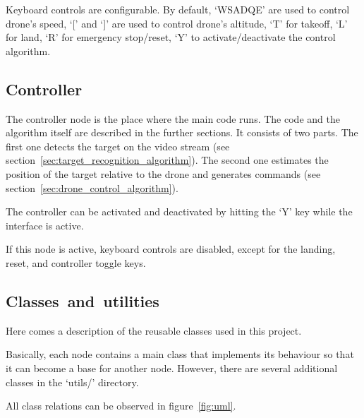 \documentclass[12pt]{article}
\begin{document}
    Keyboard controls are configurable. By default, `WSADQE' are used to
    control drone's speed, `[' and `]' are used to
    control drone's altitude, `T' for takeoff, `L' for land, `R' for emergency
    stop/reset, `Y' to activate/deactivate the control algorithm.

    \subsection{Controller}

    The controller node is the place where the main code runs.
    The code and the algorithm itself are described in the further sections.
    It consists of two parts. The first one detects the target
    on the video stream (see section~\ref{sec:target_recognition_algorithm}).
    The second one estimates the position of the target relative to the drone
    and generates commands (see section~\ref{sec:drone_control_algorithm}).

    The controller can be activated and deactivated by hitting the `Y'
    key while the interface is active.

    If this node is active, keyboard controls are disabled, except for the
    landing, reset, and controller toggle keys.

    \subsection{Classes~and~utilities}

    Here comes a description of the reusable classes used in this project.

    Basically, each node contains a main class that implements its behaviour
    so that it can become a base for another node.
    However, there are several additional classes in the `utils/'
    directory.

    All class relations can be observed in figure~\ref{fig:uml}.
\end{document}
